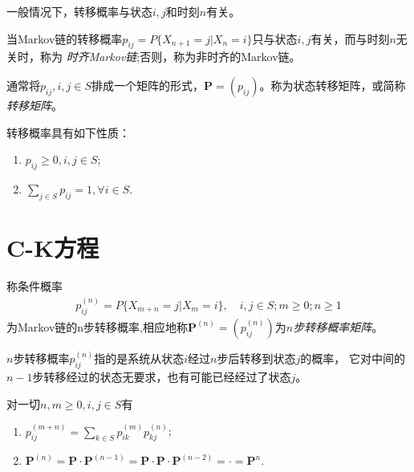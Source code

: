 一般情况下，转移概率与状态\(i,j\)和时刻\(n\)有关。

\begin{definition}\label{def:TimIndMarkov}
	当Markov链的转移概率\(p_{ij}=P\{X_{n+1}=j|X_n=i\}\)只与状态\(i,j\)有关，而与时刻\(n\)无关时，称为
	\emph{时齐Markov链};否则，称为非时齐的Markov链。
\end{definition}

\begin{definition}\label{def:TransMatr}
	通常将\(p_{ij},i,j\in S\)排成一个矩阵的形式，\(\mathbf{P}=(p_{ij})\)。称为状态转移矩阵，或简称\emph{转移矩阵}。
\end{definition}

转移概率具有如下性质：
\begin{enumerate}[\bfseries (1)]
	\item \(p_{ij}\geqslant 0,i,j\in S\);
	\item \(\sum_{j\in S}p_{ij}=1,\forall i\in S\).
\end{enumerate}

\section{C-K方程}

\begin{definition}\label{def:nTransMatr}
	称条件概率
	\begin{align*}
		p_{ij}^{(n)}=P\{X_{m+n}=j|X_m=i\},\quad i,j\in S;m \geqslant 0; n\geqslant 1
	\end{align*}
	为Markov链的n步转移概率,相应地称\(\mathbf{P}^{(n)}=(p_{ij}^{(n)})\)为\emph{\(n\)步转移概率矩阵}。
\end{definition}

\(n\)步转移概率\(p_{ij}^{(n)}\)指的是系统从状态\(i\)经过\(n\)步后转移到状态\(j\)的概率，
它对中间的\(n-1\)步转移经过的状态无要求，也有可能已经经过了状态\(j\)。


\begin{theorem}\label{prop:C-K}
	对一切\(n,m\geqslant0,i,j\in S\)有
	\begin{enumerate}[\bfseries (1)]
		\item \(p_{ij}^{(m+n)}=\sum_{k\in S}p_{ik}^{(m)}p_{kj}^{(n)}\);
		\item \(\mathbf{P}^{(n)}=\mathbf{P}\cdot \mathbf{P}^{(n-1)}=\mathbf{P}\cdot \mathbf{P}\cdot \mathbf{P}^{(n-2)}=\cdot =\mathbf{P}^{n}\).
	\end{enumerate}
\end{theorem}

